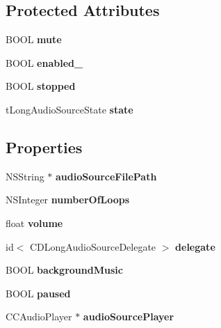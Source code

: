 \subsection*{Protected Attributes}
\begin{DoxyCompactItemize}
\item 
\mbox{\label{interfaceCDLongAudioSource_a3402e241a03e28234bb22bb6ab6aad87}} 
B\+O\+OL {\bfseries mute}
\item 
\mbox{\label{interfaceCDLongAudioSource_af7bd033921e1c38c24c767ced5f4ca3e}} 
B\+O\+OL {\bfseries enabled\+\_\+}
\item 
\mbox{\label{interfaceCDLongAudioSource_a029d279a013d66cc4d434ad6a04b6af5}} 
B\+O\+OL {\bfseries stopped}
\item 
\mbox{\label{interfaceCDLongAudioSource_a40c0707fa345c90af619984ad6262f0c}} 
t\+Long\+Audio\+Source\+State {\bfseries state}
\end{DoxyCompactItemize}
\subsection*{Properties}
\begin{DoxyCompactItemize}
\item 
\mbox{\label{interfaceCDLongAudioSource_a04f4635df6e90a7f2f3b7a571a9c43cf}} 
N\+S\+String $\ast$ {\bfseries audio\+Source\+File\+Path}
\item 
\mbox{\label{interfaceCDLongAudioSource_a46736092910939328b9b4aabb43b25a5}} 
N\+S\+Integer {\bfseries number\+Of\+Loops}
\item 
\mbox{\label{interfaceCDLongAudioSource_a4fb558153e158b558e9e32072dfb246b}} 
float {\bfseries volume}
\item 
\mbox{\label{interfaceCDLongAudioSource_a690db0af7c17d28ca88a7103f8c99cad}} 
id$<$ C\+D\+Long\+Audio\+Source\+Delegate $>$ {\bfseries delegate}
\item 
\mbox{\label{interfaceCDLongAudioSource_afcc5b159e3dd6feb30ab6de9c331ea11}} 
B\+O\+OL {\bfseries background\+Music}
\item 
\mbox{\label{interfaceCDLongAudioSource_a114c7baa9b2e8eb7845e3f450282564b}} 
B\+O\+OL {\bfseries paused}
\item 
\mbox{\label{interfaceCDLongAudioSource_a05cbef0269795fad872930b175b1c115}} 
C\+C\+Audio\+Player $\ast$ {\bfseries audio\+Source\+Player}
\end{DoxyCompactItemize}


